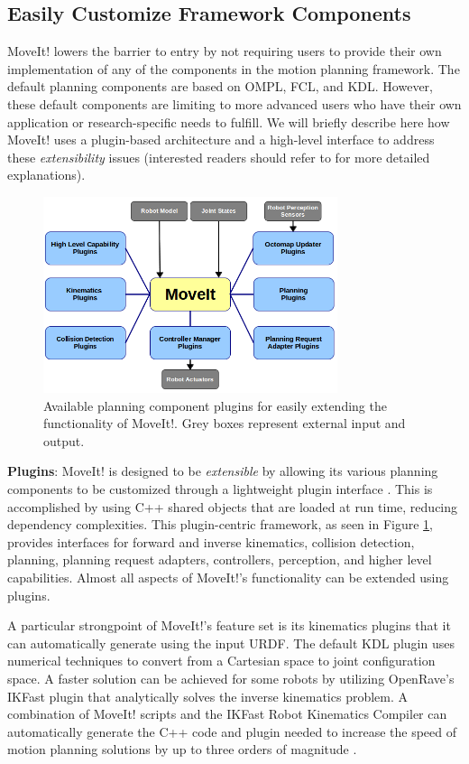 \documentclass[10pt,journal,compsoc]{joser1}
\begin{document}
{%
\subsection{Easily Customize Framework Components}
\label{subsec:extensiblity}

MoveIt! lowers the barrier to entry by not requiring users to provide their own
implementation of any of the components in the motion planning framework. The
default planning components are based on OMPL, FCL, and KDL. However, these
default components are limiting to more advanced users who have their own
application or research-specific needs to fulfill. We will briefly describe here
how MoveIt! uses a plugin-based architecture and a high-level interface to
address these \textit{extensibility} issues (interested readers should refer to
\cite{moveit} for more detailed explanations). 

\begin{figure}[!t]
\centering
\includegraphics[width=3.4in]{coleman_20131110_f10}
\caption{Available planning component plugins for easily extending the
functionality of MoveIt!. Grey boxes represent external input and output.}
\label{fig:moveit_plugins}
\end{figure}

{\bf Plugins}: MoveIt! is designed to be \textit{extensible} by allowing its
various planning components to be customized through a lightweight plugin
interface \cite{moveit}. This is accomplished by using C++ shared objects that
are loaded at run time, reducing dependency complexities. This plugin-centric
framework, as seen in Figure \ref{fig:moveit_plugins}, provides interfaces for
forward and inverse kinematics, collision detection, planning, planning request
adapters, controllers, perception, and higher level capabilities. Almost
all aspects of MoveIt!'s functionality can be extended using plugins.

A particular strongpoint of MoveIt!'s feature set is its kinematics plugins that
it can automatically generate using the input URDF. The default KDL plugin uses
numerical techniques to convert from a Cartesian space to joint configuration
space. A faster solution can be achieved for some robots by utilizing OpenRave's
IKFast \cite{ikfast} plugin that analytically solves the inverse kinematics
problem. A combination of MoveIt! scripts and the IKFast Robot Kinematics
Compiler can automatically generate the C++ code and plugin needed to increase
the speed of motion planning solutions by up to three orders of magnitude
\cite{ikfast}.

}
\end{document}
